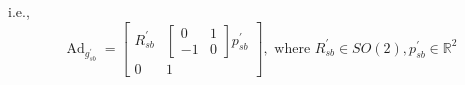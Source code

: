 i.e.,
\begin{equation*}
    \boxed{
    \operatorname{Ad}_{g_{s b}^{\prime}}=\left[\begin{array}{cc}
            R_{s b}^{\prime} & {\left[\begin{array}{cc}
                                                      0  & 1 \\
                                                      -1 & 0
                                                  \end{array}\right] p_{s b}^{\prime}} \\
            0                & 1
        \end{array}\right], \text { where } R_{s b}^{\prime} \in S O(2), p_{s b}^{\prime} \in \mathbb{R}^{2}
    }
\end{equation*}
